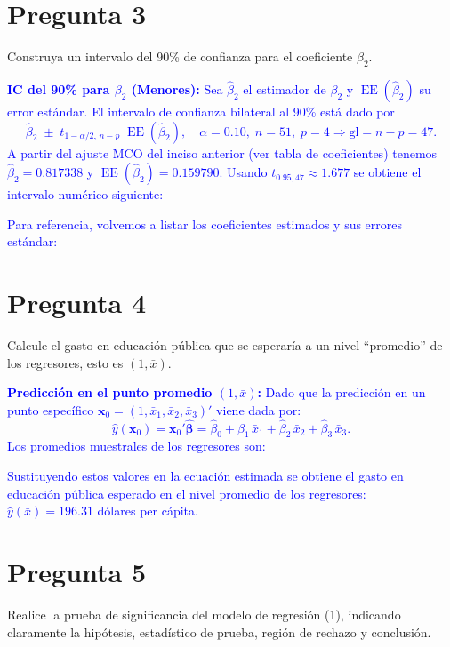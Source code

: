 \documentclass[10pt]{article}
\begin{document}
\section{Pregunta 3}
Construya un intervalo del 90\% de confianza para el coeficiente $\beta_2$. \\

\textcolor{blue}{
    \textbf{IC del 90\% para $\beta_2$ (Menores):}
    Sea $\hat\beta_2$ el estimador de $\beta_2$ y $\operatorname{EE}(\hat\beta_2)$ su error estándar. El intervalo de confianza bilateral al 90\% está dado por
    \[
        \hat\beta_2 \;\pm\; t_{1-\alpha/2,\,n-p}\; \operatorname{EE}(\hat\beta_2),\quad \alpha=0.10,\; n=51,\; p=4 \Rightarrow \text{gl}=n-p=47.
    \]
    A partir del ajuste MCO del inciso anterior (ver tabla de coeficientes) tenemos $\hat\beta_2=0.817338$ y $\operatorname{EE}(\hat\beta_2)=0.159790$. Usando $t_{0.95,47}\approx 1.677$ se obtiene el intervalo numérico siguiente:
    
    Para referencia, volvemos a listar los coeficientes estimados y sus errores estándar:
    
}
\section{Pregunta 4}
Calcule el gasto en educación pública que se esperaría a un nivel “promedio” de los regresores, esto es $(1,\bar{x})$. \\

\textcolor{blue}{
    \textbf{Predicción en el punto promedio $(1,\bar x)$:}
    Dado que la predicción en un punto específico $\mathbf{x}_0 = (1,\bar x_1, \bar x_2, \bar x_3)'$ viene dada por:
    \[
        \hat y(\mathbf{x}_0) = \mathbf{x}_0' \hat{\boldsymbol\beta} 
        = \hat\beta_0 + \hat\beta_1\,\bar x_1 + \hat\beta_2\,\bar x_2 + \hat\beta_3\,\bar x_3.
    \]
    Los promedios muestrales de los regresores son:
    
    Sustituyendo estos valores en la ecuación estimada se obtiene el gasto en educación pública esperado en el nivel promedio de los regresores:
    $\hat y(\bar x) = 196.31$ dólares per cápita.
}
\section{Pregunta 5}
Realice la prueba de significancia del modelo de regresión (1), indicando claramente la hipótesis, estadístico de prueba, región de rechazo y conclusión. \\
\end{document}
